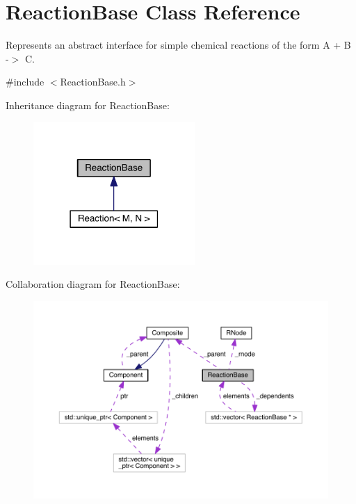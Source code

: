 \hypertarget{classReactionBase}{\section{Reaction\+Base Class Reference}
\label{classReactionBase}
}


Represents an abstract interface for simple chemical reactions of the form A + B -\/$>$ C.  




{\ttfamily \#include $<$Reaction\+Base.\+h$>$}



Inheritance diagram for Reaction\+Base\+:\nopagebreak
\begin{figure}[H]
\begin{center}
\leavevmode
\includegraphics[width=174pt]{classReactionBase__inherit__graph}
\end{center}
\end{figure}


Collaboration diagram for Reaction\+Base\+:\nopagebreak
\begin{figure}[H]
\begin{center}
\leavevmode
\includegraphics[width=350pt]{classReactionBase__coll__graph}
\end{center}
\end{figure}
